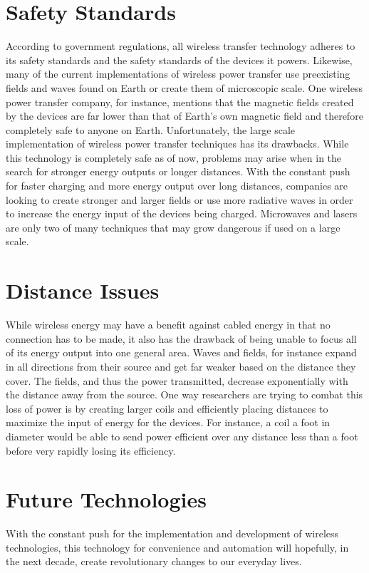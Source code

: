 \documentclass{article}
\begin{document}
\section{Safety Standards}
According to government regulations, all wireless transfer technology adheres to its safety standards and the safety standards of the devices it powers. Likewise, many of the current implementations of wireless power transfer use preexisting fields and waves found on Earth or create them of microscopic scale. One wireless power transfer company, for instance, mentions that the magnetic fields created by the devices are far lower than that of Earth's own magnetic field and therefore completely safe to anyone on Earth. Unfortunately, the large scale implementation of wireless power transfer techniques has its drawbacks. While this technology is completely safe as of now, problems may arise when in the search for stronger energy outputs or longer distances. With the constant push for faster charging and more energy output over long distances, companies are looking to create stronger and larger fields or use more radiative waves in order to increase the energy input of the devices being charged. Microwaves and lasers are only two of many techniques that may grow dangerous if used on a large scale.

\section{Distance Issues}
While wireless energy may have a benefit against cabled energy in that no connection has to be made, it also has the drawback of being unable to focus all of its energy output into one general area. Waves and fields, for instance expand in all directions from their source and get far weaker based on the distance they cover. The fields, and thus the power transmitted, decrease exponentially with the distance away from the source. One way researchers are trying to combat this loss of power is by creating larger coils and efficiently placing distances to maximize the input of energy for the devices. For instance, a coil a foot in diameter would be able to send power efficient over any distance less than a foot before very rapidly losing its efficiency.

\section{Future Technologies}
With the constant push for the implementation and development of wireless technologies, this technology for convenience and automation will hopefully, in the next decade, create revolutionary changes to our everyday lives.
\end{document}
